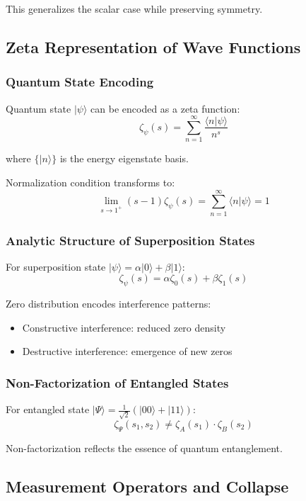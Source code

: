 \documentclass[11pt]{article}
\theoremstyle{plain}
\theoremstyle{definition}
\theoremstyle{remark}
\begin{document}
This generalizes the scalar case while preserving symmetry.

\subsection{Zeta Representation of Wave Functions}

\subsubsection{Quantum State Encoding}

Quantum state $|\psi\rangle$ can be encoded as a zeta function:
$$\zeta_{\psi}(s) = \sum_{n=1}^{\infty} \frac{\langle n | \psi \rangle}{n^s}$$

where $\{|n\rangle\}$ is the energy eigenstate basis.

Normalization condition transforms to:
$$\lim_{s \to 1^+} (s-1) \zeta_{\psi}(s) = \sum_{n=1}^{\infty} \langle n | \psi \rangle = 1$$

\subsubsection{Analytic Structure of Superposition States}

For superposition state $|\psi\rangle = \alpha|0\rangle + \beta|1\rangle$:
$$\zeta_{\psi}(s) = \alpha \zeta_0(s) + \beta \zeta_1(s)$$

Zero distribution encodes interference patterns:
\begin{itemize}
\item Constructive interference: reduced zero density
\item Destructive interference: emergence of new zeros
\end{itemize}

\subsubsection{Non-Factorization of Entangled States}

For entangled state $|\Psi\rangle = \frac{1}{\sqrt{2}}(|00\rangle + |11\rangle)$:
$$\zeta_{\Psi}(s_1, s_2) \neq \zeta_A(s_1) \cdot \zeta_B(s_2)$$

Non-factorization reflects the essence of quantum entanglement.

\subsection{Measurement Operators and Collapse}
\end{document}
